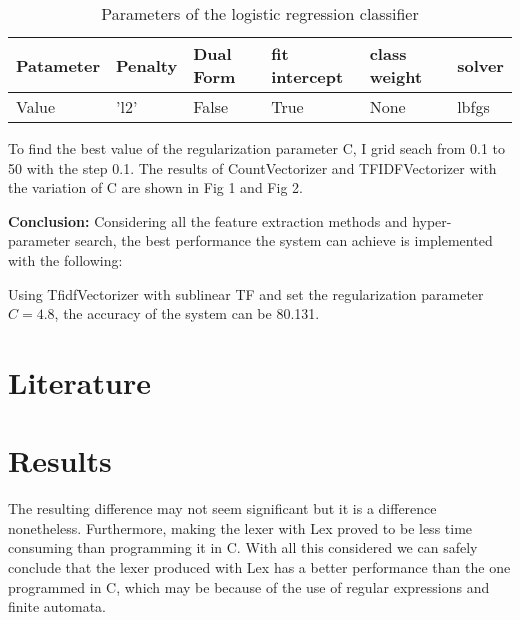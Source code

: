 \documentclass[letterpaper, 10 pt, conference]{ieeeconf}  %
\begin{document}
\begin{table}[h]
	\caption{Parameters of the logistic regression classifier}  
	\begin{tabular*}{12cm}{llllll}  
		\hline  
		Patameter & Penalty  & Dual Form &fit intercept  &class weight &solver\\  
		\hline  
		Value  & 'l2' & False &True &None &lbfgs\\    
		\hline  
	\end{tabular*}  
\end{table}   

To find the best value of the regularization parameter C, I grid seach from 0.1 to 50 with the step 0.1. The results of CountVectorizer and TFIDFVectorizer with the variation of C are shown in Fig 1 and Fig 2.




\textbf{Conclusion: } Considering all the feature extraction methods and hyper-parameter search, the best performance the system can achieve is implemented with the following: 

Using TfidfVectorizer with sublinear TF and set the regularization parameter $C=4.8$, the accuracy of the system can be 80.131.




\section{Literature}




\section{Results}

The resulting difference may not seem significant but it is a difference nonetheless. Furthermore, making the lexer with Lex proved to be less time consuming than programming it in C. With all this considered we can safely conclude that the lexer produced with Lex has a better performance than the one programmed in C, which may be because of the use of regular expressions and finite automata.
\end{document}
